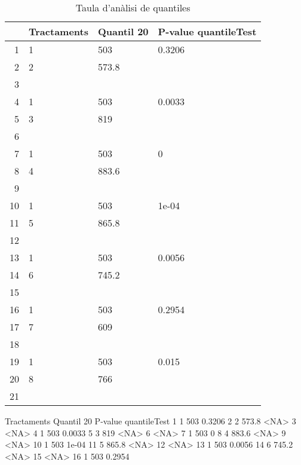 \documentclass[11pt,a4paper]{article}\usepackage[]{graphicx}\usepackage[]{color}
\begin{document}
\clearpage
\begin{table}[ht]
\centering
\begin{tabular}{rlll}
  \hline
 & Tractaments & Quantil 20 & P-value quantileTest \\ 
  \hline
1 & 1 & 503 & 0.3206 \\ 
  2 & 2 & 573.8 &  \\ 
  3 &  &  &  \\ 
  4 & 1 & 503 & 0.0033 \\ 
  5 & 3 & 819 &  \\ 
  6 &  &  &  \\ 
  7 & 1 & 503 & 0 \\ 
  8 & 4 & 883.6 &  \\ 
  9 &  &  &  \\ 
  10 & 1 & 503 & 1e-04 \\ 
  11 & 5 & 865.8 &  \\ 
  12 &  &  &  \\ 
  13 & 1 & 503 & 0.0056 \\ 
  14 & 6 & 745.2 &  \\ 
  15 &  &  &  \\ 
  16 & 1 & 503 & 0.2954 \\ 
  17 & 7 & 609 &  \\ 
  18 &  &  &  \\ 
  19 & 1 & 503 & 0.015 \\ 
  20 & 8 & 766 &  \\ 
  21 &  &  &  \\ 
   \hline
\end{tabular}
\caption{Taula d'anàlisi de quantiles} 
\label{tab:tot}
\end{table}
   Tractaments Quantil 20 P-value quantileTest
1            1        503               0.3206
2            2      573.8                 <NA>
3                                         <NA>
4            1        503               0.0033
5            3        819                 <NA>
6                                         <NA>
7            1        503                    0
8            4      883.6                 <NA>
9                                         <NA>
10           1        503                1e-04
11           5      865.8                 <NA>
12                                        <NA>
13           1        503               0.0056
14           6      745.2                 <NA>
15                                        <NA>
16           1        503               0.2954
\end{document}
